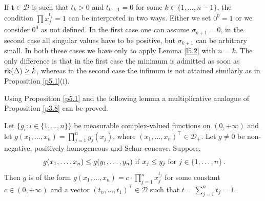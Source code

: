 \documentclass{amsart}
\begin{document}
\begin{rmk} \label{r5.4}
If ${\mathbf t} \in{\mathcal D}$ is such that $t_k > 0$ and $t_{k+1}=0$ for some $k \in \{ 1,\ldots,n-1\}$, the condition $\prod x_j^{t_j}=1$ can be interpreted in two ways. Either we set $0^0=1$ or we consider $0^0$ as not defined. In the first case one can assume $\sigma_{k+1}=0$, in the second case all singular values have to be positive, but $\sigma_{k+1}$ can be arbitrary small. In both these cases we have only to apply Lemma \ref{l5.2} with $n=k$. The only difference is that in the first case the minimum is admitted as soon as ${\rm rk}(\Delta) \geq k$, whereas in the second case the infimum is not attained similarly as in Proposition \ref{p5.1}(i).
\end{rmk}

Using Proposition \ref{p5.1} and the following lemma a multiplicative analogue of Proposition \ref{p3.8} can be proved. 

\begin{lem} \label{l5.5}
   Let $\{ g_i : i \in \{ 1,\ldots,n \}\}$ be measurable complex-valued functions on $(0,+\infty)$ and let $g(x_1,\ldots,x_n)=\prod_{j=1}^n g_j(x_j)$, where $(x_1,\ldots,x_n)^\top \in {\mathcal D}_+$. Let $g \not= 0$ be non-negative, positively homogeneous and Schur concave. Suppose,
   \begin{equation}\ \label{f5.6}
       g(x_1,\ldots,x_n) \leq g(y_1,\ldots,y_n) \,\, {\rm if} \,\, x_j \leq y_j \,\, {\rm for} \,\, j \in \{1,\ldots,n\} \, .
   \end{equation}       
Then $g$ is of the form $g(x_1,\ldots,x_n) = c \cdot \prod_{j=1}^n x_j^{t_j}$ for some constant $c \in (0,+\infty)$ and a vector $(t_n,\ldots,t_1)^\top \in {\mathcal D}$ such that $t=\sum_{j=1}^n t_j = 1$.
\end{lem}   
\end{document}
